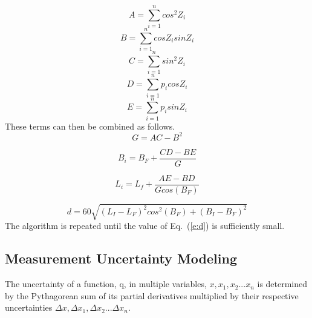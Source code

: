 \documentclass[]{aiaa-tc}%
\begin{document}
\begin{equation}
A = \sum \limits_{i=1}^n cos^{2}Z_{i}
\end{equation}
\begin{equation}
B = \sum \limits_{i=1}^n cosZ_{i}sinZ_{i}
\end{equation}
\begin{equation}
C = \sum \limits_{i=1}^n sin^{2}Z_{i}
\end{equation}
\begin{equation}
D = \sum \limits_{i=1}^n p_{i}cosZ_{i}
\end{equation}
\begin{equation}
E = \sum \limits_{i=1}^n p_{i}sinZ_{i}
\end{equation}
These terms can then be combined as follows.  
\begin{equation}
 \label{e:G}
    G = AC-B^{2}
\end{equation}

\begin{equation}
 \label{e:Bi}
    B_{i} = B_{F} + \frac{CD-BE}{G}
\end{equation}

\begin{equation}
 \label{e:Li}
    L_{i} = L_{f} + \frac{AE - BD}{Gcos(B_{F})}
\end{equation}

\begin{equation}
 \label{e:d}
    d = 60\sqrt{(L_{I} - L_{F})^{2}cos^{2}(B_{F}) + (B_{I} - B_{F})^{2}}
\end{equation}
The algorithm is repeated until the value of Eq.~(\ref{e:d}) is sufficiently small.  

\subsection*{Measurement Uncertainty Modeling}
The uncertainty of a function, q, in multiple variables, $x, x_{1}, x_{2} ... x_{n}$ is determined by the Pythagorean sum of its partial derivatives multiplied by their respective uncertainties $\Delta x, \Delta x_{1}, \Delta x_{2} ... \Delta x_{n}$\cite{b:error}.  
\end{document}
